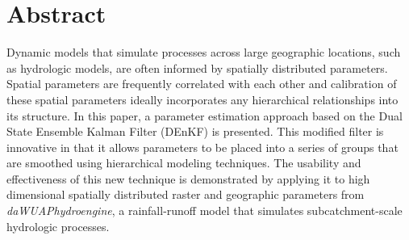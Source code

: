 \documentclass[12pt,twoside]{mitthesis}
\begin{document}
\pagestyle{plain}


\section{Abstract}



Dynamic models that simulate processes across large geographic locations, such as hydrologic models, are often informed by spatially distributed parameters. Spatial parameters are frequently correlated with each other and calibration of these spatial parameters ideally incorporates any hierarchical relationships into its structure. In this paper, a parameter estimation approach based on the Dual State Ensemble Kalman Filter (DEnKF) is presented. This modified filter is innovative in that it allows parameters to be placed into a series of groups that are smoothed using hierarchical modeling techniques. The usability and effectiveness of this new technique is demonstrated by applying it to high dimensional spatially distributed raster and geographic parameters from \textit{daWUAPhydroengine}, a rainfall-runoff model that simulates subcatchment-scale hydrologic processes.







\appendix




\end{document}
